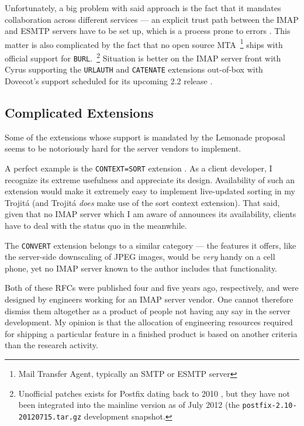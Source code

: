 \documentclass[trojita]{subfiles}
\begin{document}
Unfortunately, a big problem with said approach is the fact that it mandates collaboration across different services ---
an explicit trust path between the IMAP and ESMTP servers have to be set up, which is a process prone to errors
\cite{qmf-fastmail-burl-bug}.  This matter is also complicated by the fact that no open source MTA~\footnote{Mail
Transfer Agent, typically an SMTP or ESMTP server} ships with official support for {\tt BURL}.~\footnote{Unofficial
patches exists for Postfix dating back to 2010 \cite{apple-postfix-burl}, but they have not been integrated into the
mainline version as of July 2012 (the {\tt postfix-2.10-20120715.tar.gz} development snapshot.}  Situation is better on
the IMAP server front with Cyrus supporting the {\tt URLAUTH} and {\tt CATENATE} extensions out-of-box with Dovecot's
support scheduled for its upcoming 2.2 release \cite{imap-server-extension-matrix}.

\subsection{Complicated Extensions}

Some of the extensions whose support is mandated by the Lemonade proposal seems to be notoriously hard for the server
vendors to implement.

A perfect example is the {\tt CONTEXT=SORT} extension \cite{rfc5267}.  As a client developer, I recognize its extreme
usefulness and appreciate its design.  Availability of such an extension would make it extremely easy to implement
live-updated sorting in my Trojitá (and Trojitá {\em does} make use of the sort context extension).  That said, given
that no IMAP server which I am aware of announces its availability, clients have to deal with the status quo in the
meanwhile.

The {\tt CONVERT} extension \cite{rfc5259} belongs to a similar category --- the features it offers, like the
server-side downscaling of JPEG images, would be {\em very} handy on a cell phone, yet no IMAP server known to the
author includes that functionality.

Both of these RFCs were published four and five years ago, respectively, and were designed by engineers working for an
IMAP server vendor.  One cannot therefore dismiss them altogether as a product of people not having any say in the
server development.  My opinion is that the allocation of engineering resources required for shipping a particular
feature in a finished product is based on another criteria than the research activity.
\end{document}

